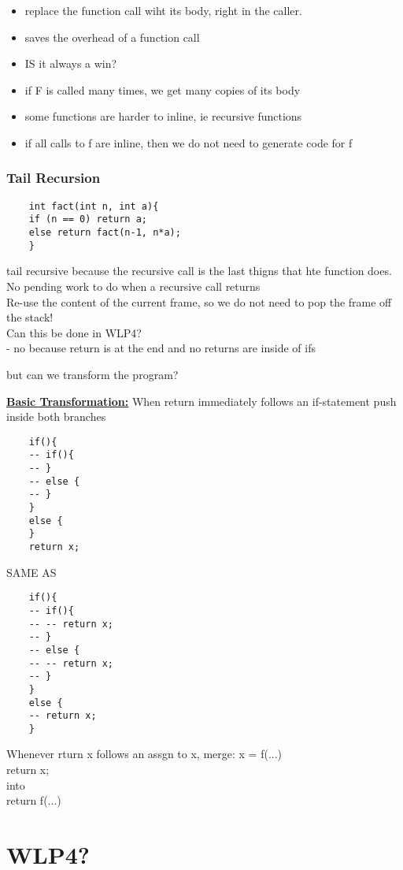 \documentclass[12pt]{article}
\newcommand{\myt}[1]{\textbf{\underline{#1}}}
\begin{document}
	\begin{itemize}
		\item replace the function call wiht its body, right in the caller.
		\item saves the overhead of a function call
		\item IS it always a win?
		\item if F is called many times, we get many copies of its body\\
		\item some functions are harder to inline, ie recursive functions\\
		\item if all calls to f are inline, then we do not need to generate code for f\\
	\end{itemize}
	
	\subsubsection{Tail Recursion}
	\begin{verbatim}
	int fact(int n, int a){
	if (n == 0) return a;
	else return fact(n-1, n*a);
	}
	\end{verbatim}
	tail recursive because the recursive call is the last thigns that hte function does.\\
	No pending work to do when a recursive call returns\\
	Re-use the content of the current frame, so we do not need to pop the frame off the stack!\\
	Can this be done in WLP4?\\
	- no because return is at the end and no returns are inside of ifs
	
	but can we transform the program?
	
	\myt{Basic Transformation:}
	When return immediately follows an if-statement push inside both branches\\
	
	\begin{verbatim}
	if(){
	-- if(){
	-- }
	-- else {
	-- }
	}
	else {
	}
	return x;
	\end{verbatim}
	SAME AS
	\begin{verbatim}
	if(){
	-- if(){
	-- -- return x;
	-- }
	-- else {
	-- -- return x;
	-- }
	}
	else {
	-- return x;
	}
	\end{verbatim}	
	
	Whenever rturn x follows an assgn to x, merge:
	x = f(...)\\
	return x;\\
	
	into\\
	return f(...)\\
	
	\section*{WLP4?}
	
\end{document}
